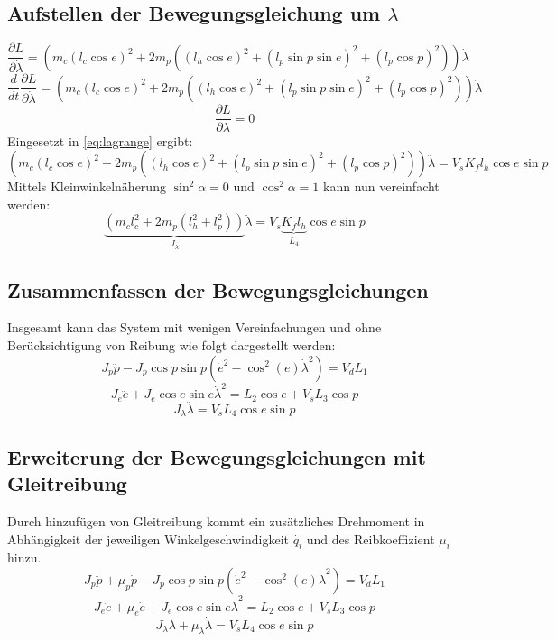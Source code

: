 \documentclass{article}
\begin{document}
\subsection{Aufstellen der Bewegungsgleichung um $\lambda$}
\begin{equation}
\frac{\partial L}{\partial \dot{\lambda}} = (m_c (l_c \cos e)^2
+ 2 m_p((l_h \cos e)^2 + (l_p \sin p \sin e)^2+(l_p \cos p)^2))\dot{\lambda}
\end{equation}
\begin{equation}
\frac{d}{dt}\frac{\partial L}{\partial \dot{\lambda}} = (m_c (l_c \cos e)^2
+ 2 m_p((l_h \cos e)^2 + (l_p \sin p \sin e)^2+(l_p \cos p)^2))\ddot{\lambda}
\end{equation}
\begin{equation}
\frac{\partial L}{\partial \lambda} = 0
\end{equation}
Eingesetzt in \eqref{eq:lagrange} ergibt:
\begin{equation}
(m_c (l_c \cos e)^2
+ 2 m_p((l_h \cos e)^2 + (l_p \sin p \sin e)^2+(l_p \cos p)^2))\ddot{\lambda} = V_s K_f l_h \cos e \sin p
\end{equation}
Mittels Kleinwinkelnäherung $\sin^2 \alpha = 0$ und $\cos^2 \alpha = 1$  kann nun vereinfacht werden:
\begin{equation}
\underbrace{(m_c l_c^2 +  2 m_p(l_h^2 + l_p^2))}_{J_\lambda} \ddot{\lambda} = V_s \underbrace{K_f l_h}_{L_4} \cos e \sin p
\end{equation}
\subsection{Zusammenfassen der Bewegungsgleichungen}
Insgesamt kann das System mit wenigen Vereinfachungen und ohne Berücksichtigung von Reibung wie folgt dargestellt werden:
\begin{equation}
J_p \ddot{p} - J_p \cos p \sin p (\dot{e}^2- \cos^2 (e) \dot{\lambda}^2) = V_d L_1
\end{equation}
\begin{equation}
J_e\ddot{e} + J_e \cos e \sin e \dot{\lambda}^2 
= L_2 \cos e + V_s L_3 \cos p
\end{equation}
\begin{equation}
J_\lambda \ddot{\lambda} = V_s L_4 \cos e \sin p
\end{equation}
\subsection{Erweiterung der Bewegungsgleichungen mit Gleitreibung}
Durch hinzufügen von Gleitreibung kommt ein zusätzliches Drehmoment in Abhängigkeit der jeweiligen Winkelgeschwindigkeit $\dot{q_i}$ und des Reibkoeffizient $\mu_i$  hinzu.
\begin{equation}
J_p \ddot{p} + \mu_p \dot{p} - J_p \cos p \sin p (\dot{e}^2- \cos^2 (e) \dot{\lambda}^2) = V_d L_1
\end{equation}
\begin{equation}
J_e\ddot{e} + \mu_e \dot{e} + J_e \cos e \sin e \dot{\lambda}^2 
= L_2 \cos e + V_s L_3 \cos p
\end{equation}
\begin{equation}
J_\lambda \ddot{\lambda} + \mu_\lambda \dot{\lambda} = V_s L_4 \cos e \sin p
\end{equation}
\end{document}
